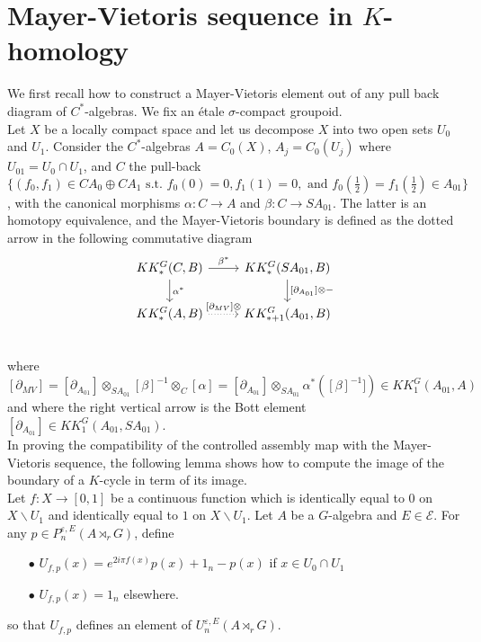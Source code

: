 
\section{Mayer-Vietoris sequence in $K$-homology}

We first recall how to construct a Mayer-Vietoris element out of any pull back diagram of $C^*$-algebras. We fix an étale $\sigma$-compact groupoid.\\

Let $X$ be a locally compact space and let us decompose $X$ into two open sets $U_0$ and $U_1$. Consider the $C^*$-algebras $A=C_0(X)$, $A_j=C_0(U_j)$ where $U_{01}=U_0\cap U_1$, and $C$ the pull-back $\{(f_0,f_1) \in CA_0\oplus CA_1 \text{ s.t. } f_0(0)=0,f_1(1)=0,\text{ and } f_0(\frac{1}{2})=f_1(\frac{1}{2})\in A_{01}\}$, with the canonical morphisms $\alpha :C \rightarrow A$ and $\beta : C \rightarrow SA_{01}$. The latter is an homotopy equivalence, and the Mayer-Vietoris boundary is defined as the dotted arrow in the following commutative diagram
\[\begin{tikzcd}
KK^G_*(C,B) \arrow{r}{\beta^*}\arrow{d}{ \alpha^*}& KK^G_*(SA_{01},B)\arrow{d}{[\partial_{A_{01}}]\otimes -}\\
KK^G_*(A,B) \arrow[dotted]{r}{ [\partial_{MV}] \otimes}& KK^G_{*+1}(A_{01},B)\\
\end{tikzcd}\]
where $[\partial_{MV}]=[\partial_{A_{01}}]\otimes_{SA_{01}} [\beta]^{-1}\otimes_C [\alpha] = [\partial_{A_{01}}]\otimes_{SA_{01}} \alpha^*([\beta]^{-1}])\in KK^G_1(A_{01},A)$ and where the right vertical arrow is the Bott element $[\partial_{A_{01}}]\in KK_1^G(A_{01},SA_{01})$.\\

In proving the compatibility of the controlled assembly map with the Mayer-Vietoris sequence, the following lemma shows how to compute the image of 
the boundary of a $K$-cycle in term of its image.\\

Let $f : X\rightarrow [0,1]$ be a continuous function which is identically equal to $0$ on $X\backslash U_1 $ and identically equal to $1$ on $X\backslash U_1$. Let $A$ be a $G$-algebra and $E\in\mathcal E$. For any $p\in P_n^{\varepsilon,E}(A\rtimes_r G) $, define 
\begin{itemize}
\item[$\bullet$] $U_{f,p}(x) = e^{2i\pi f(x)}p(x) +1_n -p(x)$ if $x\in U_0\cap U_1$
\item[$\bullet$] $U_{f,p}(x) = 1_n$ elsewhere.
\end{itemize}
so that $U_{f,p}$ defines an element of $ U^{\varepsilon,E}_n(A\rtimes_r G)$.\\

